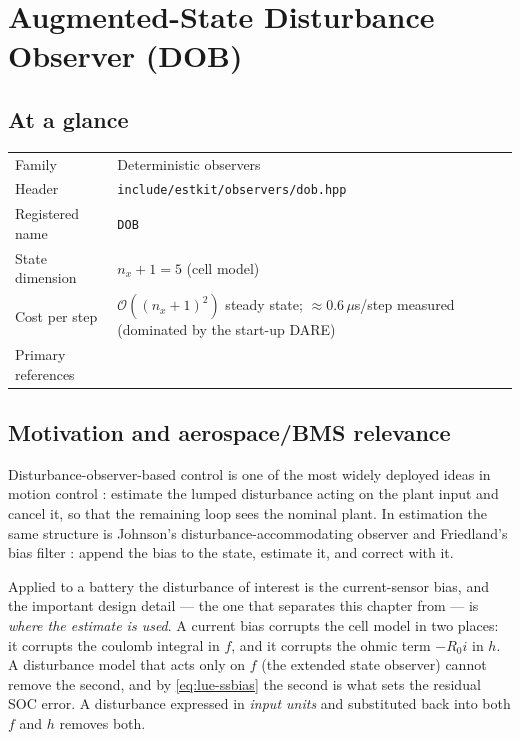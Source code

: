 \chapter{Augmented-State Disturbance Observer (DOB)}
\label{ch:dob}

\section*{At a glance}
\begin{tabular}{@{}l>{\raggedright\arraybackslash}p{}@{}}
Family & Deterministic observers \\
Header & \texttt{include/estkit/observers/dob.hpp} \\
Registered name & \texttt{DOB} \\
State dimension & $n_x + 1 = 5$ (cell model) \\
Cost per step & $\mathcal{O}((n_x{+}1)^2)$ steady state; $\approx 0.6\,\mu$s/step measured (dominated by the start-up DARE) \\
Primary references & \cite{ohnishi1996dob,chen2016dobsurvey,johnson1971dac,friedland1969bias,zhao2017observability} \\
\end{tabular}

\section{Motivation and aerospace/BMS relevance}
Disturbance-observer-based control is one of the most widely deployed ideas in motion control
\cite{ohnishi1996dob,chen2016dobsurvey}: estimate the lumped disturbance acting on the plant
input and cancel it, so that the remaining loop sees the nominal plant.  In estimation the same
structure is Johnson's disturbance-accommodating observer \cite{johnson1971dac} and Friedland's
bias filter \cite{friedland1969bias}: append the bias to the state, estimate it, and correct with
it.

Applied to a battery the disturbance of interest is the current-sensor bias, and the important
design detail --- the one that separates this chapter from  --- is \emph{where the
estimate is used}.  A current bias corrupts the cell model in two places: it corrupts the coulomb
integral in $f$, and it corrupts the ohmic term $-R_0 i$ in $h$.  A disturbance model that acts
only on $f$ (the extended state observer) cannot remove the second, and by \eqref{eq:lue-ssbias}
the second is what sets the residual SOC error.  A disturbance expressed in \emph{input units}
and substituted back into both $f$ and $h$ removes both.

